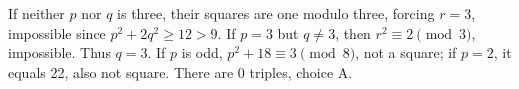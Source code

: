 If neither $p$ nor $q$ is three, their squares are one modulo three, forcing $r=3$, impossible since $p^2+2q^2\ge12>9$. If $p=3$ but $q\ne3$, then $r^2\equiv2\pmod3$, impossible. Thus $q=3$. If $p$ is odd, $p^2+18\equiv3\pmod8$, not a square; if $p=2$, it equals 22, also not square. There are $\boxed{0}$ triples, choice A.
